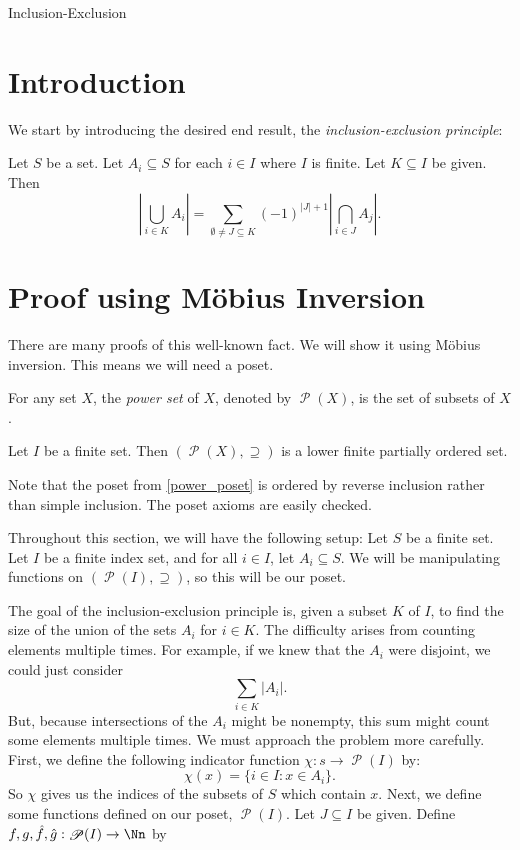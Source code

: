 \documentclass[12pt]{pom_thesis}
\DeclareMathOperator{\ps}{\mathscr{P}}
\begin{document}
\begin{chapter}{Inclusion-Exclusion}
\section{Introduction}
We start by introducing the desired end result, the \emph{inclusion-exclusion principle}:
\begin{thm}\label{iep}
Let $S$ be a set. Let $A_i \subseteq S$ for each $i \in I$ where $I$ is finite. Let $K \subseteq I$ be given. Then
\[
\left|\bigcup_{i \in K}A_i\right| = \sum_{\emptyset \neq J \subseteq K}(-1)^{|J| + 1}\left|\bigcap_{i \in J}A_j\right|
.\]
\end{thm}
\section{Proof using M\"obius Inversion} %
There are many proofs of this well-known fact. We will show it using M\"obius inversion. This means we will need a poset.

\begin{defn}
For any set $X$, the \emph{power set} of $X$, denoted by $\ps(X)$, is the set of subsets of $X$. 
\end{defn}
\begin{rmk}\label{power_poset}
Let $I$ be a finite set. Then $(\ps(X), \supseteq)$ is a lower finite partially ordered set.
\end{rmk}
Note that the poset from \ref{power_poset} is ordered by reverse inclusion rather than simple inclusion. The poset axioms are easily checked.

Throughout this section, we will have the following setup: Let $S$ be a finite set. Let $I$ be a finite index set, and for all $i \in I$, let $A_i \subseteq S$. We will be manipulating functions on $(\ps(I), \supseteq)$, so this will be our poset. 

The goal of the inclusion-exclusion principle is, given a subset $K$ of $I$, to find the size of the union of the sets $A_i$ for $i \in K$. The difficulty arises from counting elements multiple times. For example, if we knew that the $A_i$ were disjoint, we could just consider
\[
\sum_{i \in K}\left|A_i\right|.
\]
But, because intersections of the $A_i$ might be nonempty, this sum might count some elements multiple times. We must approach the problem more carefully. First, we define the following indicator function $\chi: s \rightarrow \ps(I)$ by:
\[
\chi(x) = \{i \in I : x \in A_i\}.
\]
So $\chi$ gives us the indices of the subsets of $S$ which contain $x$.  
Next, we define some functions defined on our poset, $\ps(I)$.
Let $J \subseteq I$ be given. Define $f,g,\hat{f}, \hat{g}:\ps(I) \rightarrow \Nn$ by


\end{chapter}
\end{document}
